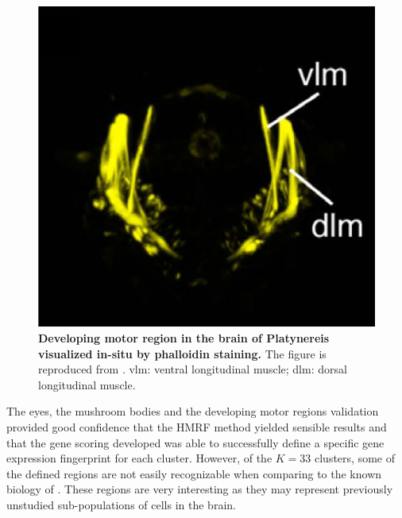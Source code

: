 		
	\begin{figure}[h]
\centerline{\includegraphics[width=0.6\linewidth]{gfx/chapter6/muscle_stain.png}}
\caption{{\bf Developing motor region in the brain of Platynereis visualized in-situ by phalloidin staining.} The figure is reproduced from \cite{Fischer10}. vlm: ventral longitudinal muscle; dlm: dorsal longitudinal muscle.}
\label{fig:muscles_stain}
	\end{figure}
	
	The eyes, the mushroom bodies and the developing motor regions validation provided good confidence that the HMRF method yielded sensible results and that the gene scoring developed was able to successfully define a specific gene expression fingerprint for each cluster. However, of the $K=33$ clusters, some of the defined regions are not easily recognizable when comparing to the known biology of \platy{}. These regions are very interesting as they may represent previously unstudied sub-populations of cells in the brain. 



